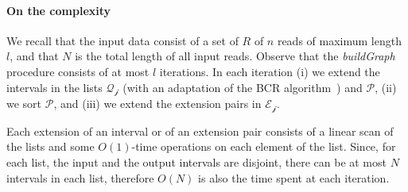 \documentclass[runningheads,envcountsame,a4paper]{llncs}
\begin{document}





\paragraph{On the complexity}





We recall that the input data consist of a set of  $R$ of $n$ reads of maximum
length $l$, and that $N$ is the total length of all input reads.
Observe that the \emph{buildGraph} procedure consists of  at most $l$ iterations.
In each iteration (i) we extend the intervals in the lists $\mathcal{Q_{j}}$ (with an
adaptation of the BCR algorithm~\cite{Bauer2013}) and $\mathcal P$, (ii) we sort
$\mathcal P$, and (iii) we extend the extension pairs in $\mathcal{E_{j}}$.

Each extension of an interval or of an extension pair consists of a linear scan
of the lists and some $O(1)$-time operations on each element of the list.
Since, for each list, the input and the output intervals are disjoint, there can
be at most $N$ intervals in each list, therefore $O(N)$ is also the time spent
at each iteration.
\end{document}
